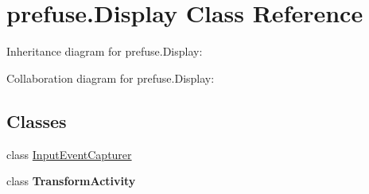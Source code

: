 \hypertarget{classprefuse_1_1_display}{\section{prefuse.\-Display \-Class \-Reference}
\label{classprefuse_1_1_display}
}


\-Inheritance diagram for prefuse.\-Display\-:


\-Collaboration diagram for prefuse.\-Display\-:
\subsection*{\-Classes}
\begin{DoxyCompactItemize}
\item 
class \hyperlink{classprefuse_1_1_display_1_1_input_event_capturer}{\-Input\-Event\-Capturer}
\item 
class {\bfseries \-Transform\-Activity}
\end{DoxyCompactItemize}
